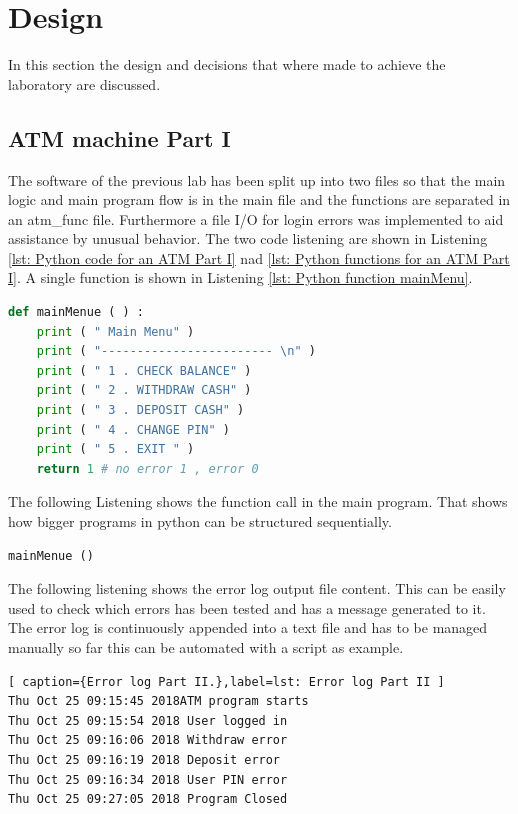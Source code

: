\section{Design}\label{sec: Design}
In this section the design and decisions that where made to achieve the laboratory are discussed.

\subsection{ATM machine Part I}\label{subsec: ATM machine Part I}
The software of the previous lab has been split up into two files so that the main logic and main program flow is in the main file and the functions are separated in an atm\_func file. Furthermore a file I/O for login errors was implemented to aid assistance by unusual behavior. The two code listening are shown in Listening \ref{lst: Python code for an ATM Part I} nad \ref{lst: Python functions for an ATM Part I}. A single function is shown in Listening \ref{lst: Python function mainMenu}.

\begin{lstlisting}[style=PythonStyle, language=Python, caption={Python function mainMenu .},label=lst: Python function mainMenu ]
def mainMenue ( ) :
	print ( " Main Menu" )
	print ( "------------------------ \n" )
	print ( " 1 . CHECK BALANCE" )
	print ( " 2 . WITHDRAW CASH" )
	print ( " 3 . DEPOSIT CASH" )
	print ( " 4 . CHANGE PIN" )
	print ( " 5 . EXIT " )
	return 1 # no error 1 , error 0
\end{lstlisting}

The following Listening shows the function call in the main program. That shows how bigger programs in python can be structured sequentially.

\begin{lstlisting}[style=PythonStyle, language=Python, caption={Python function call mainMenu .},label=lst: Python function call mainMenu ]
mainMenue () 
\end{lstlisting}
The following listening shows the error log output file content. This can be easily used to check which errors has been tested and has a message generated to it. The error log is continuously appended into a text file and has to be managed manually so far this can be automated with a script as example.
\begin{lstlisting}[ caption={Error log Part II.},label=lst: Error log Part II ]
Thu Oct 25 09:15:45 2018ATM program starts 
Thu Oct 25 09:15:54 2018 User logged in 
Thu Oct 25 09:16:06 2018 Withdraw error
Thu Oct 25 09:16:19 2018 Deposit error
Thu Oct 25 09:16:34 2018 User PIN error
Thu Oct 25 09:27:05 2018 Program Closed
\end{lstlisting}

